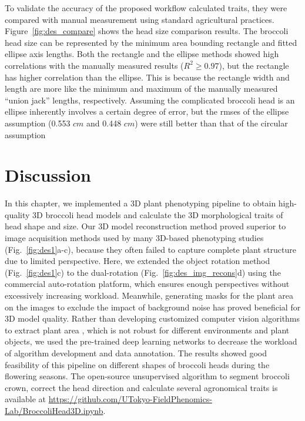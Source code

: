 To validate the accuracy of the proposed workflow calculated traits, they were compared with manual measurement using standard agricultural practices. Figure~\ref{fig:des_compare} shows the head size comparison results. The broccoli head size can be represented by the minimum area bounding rectangle and fitted ellipse axis lengths. Both the rectangle and the ellipse methods showed high correlations with the manually measured results ($R^2 \geq 0.97$), but the rectangle has higher correlation than the ellipse. This is because the rectangle width and length are more like the minimum and maximum of the manually measured ``union jack'' lengths, respectively. Assuming the complicated broccoli head is an ellipse inherently involves a certain degree of error, but the \gls{rmse}s of the ellipse assumption (0.553 $cm$ and 0.448 $cm$) were still better than that of the circular assumption \citep[Table 5, \gls{rmse}=0.97 $cm$]{blok_image_2021}



\section{Discussion}

In this chapter, we implemented a 3D plant phenotyping pipeline to obtain high-quality 3D broccoli head models and calculate the 3D morphological traits of head shape and size. Our 3D model reconstruction method proved superior to image acquisition methods used by many 3D-based phenotyping studies (Fig.~\ref{fig:des1}a-c), because they often failed to capture complete plant structure due to limited perspective. Here, we extended the object rotation method (Fig.~\ref{fig:des1}c) to the dual-rotation (Fig.~\ref{fig:des_img_recons}d) using the commercial auto-rotation platform, which ensures enough perspectives without excessively increasing workload. Meanwhile, generating masks for the plant area on the images to exclude the impact of background noise has proved beneficial for 3D model quality. Rather than developing customized computer vision algorithms to extract plant area \citep{nguyen_3d_2016,kochi_3d_2018,kochi_all_2022}, which is not robust for different environments and plant objects, we used the pre-trained deep learning networks to decrease the workload of algorithm development and data annotation. The results showed good feasibility of this pipeline on different shapes of broccoli heads during the flowering seasons. The open-source unsupervised algorithm to segment broccoli crown, correct the head direction and calculate several agronomical traits is available at \url{https://github.com/UTokyo-FieldPhenomics-Lab/BroccoliHead3D.ipynb}.

